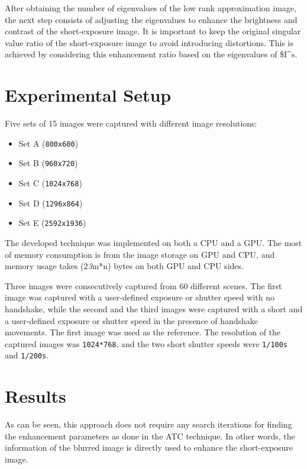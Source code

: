 After obtaining the number of eigenvalues of the low rank approximation
image, the next step consists of adjusting the eigenvalues to enhance
the brightness and contrast of the short-exposure image. It is important
to keep the original singular value ratio of the short-exposure image to
avoid introducing distortions. This is achieved by considering this
enhancement ratio based on the eigenvalues of \$I\^{}s.

\hypertarget{experimental-setup}{%
\section{Experimental Setup}\label{experimental-setup}}

Five sets of 15 images were captured with different image resolutions:

\begin{itemize}
  \tightlist
  \item
  Set A (\texttt{800x600})
  \item
  Set B (\texttt{960x720})
  \item
  Set C (\texttt{1024x768})
  \item
  Set D (\texttt{1296x864})
  \item
  Set E (\texttt{2592x1936})
\end{itemize}

The developed technique was implemented on both a CPU and a GPU. The
most of memory consumption is from the image storage on GPU and CPU, and
memory usage takes (2\emph{3}m*n) bytes on both GPU and CPU sides.

Three images were consecutively captured from 60 different scenes. The
first image was captured with a user-defined exposure or shutter speed
with no handshake, while the second and the third images were captured
with a short and a user-defined exposure or shutter speed in the
presence of handshake movements. The first image was used as the
reference. The resolution of the captured images was \texttt{1024*768},
and the two short shutter speeds were \texttt{1/100s} and
\texttt{1/200s}.

\hypertarget{results}{%
\section{Results}\label{results}}

As can be seen, this approach does not require any search iterations for
finding the enhancement parameters as done in the ATC technique. In
other words, the information of the blurred image is directly used to
enhance the short-exposure image.

